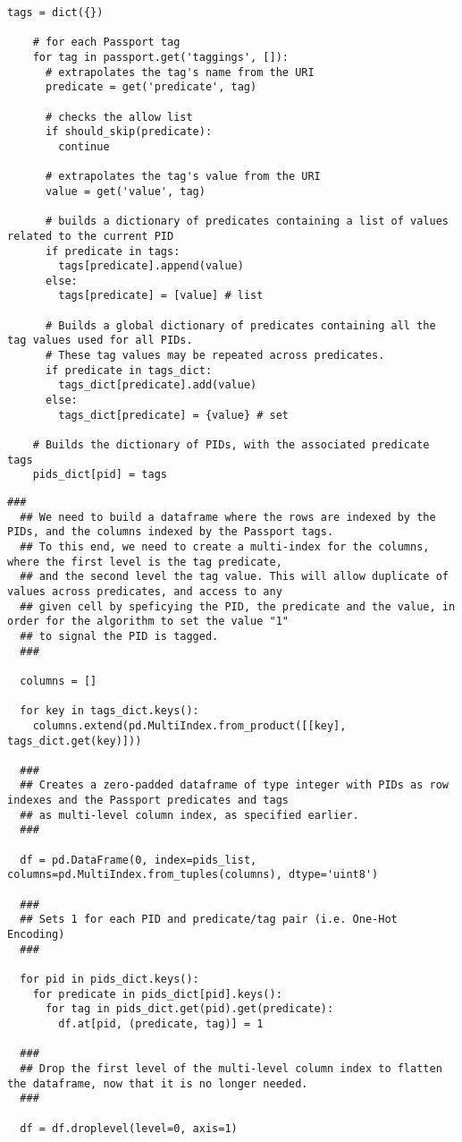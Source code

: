 \begin{lstlisting}[caption={Passport tags loading},label={lst:data_loading}]
    tags = dict({})

    # for each Passport tag
    for tag in passport.get('taggings', []):
      # extrapolates the tag's name from the URI
      predicate = get('predicate', tag)

      # checks the allow list
      if should_skip(predicate):
        continue

      # extrapolates the tag's value from the URI
      value = get('value', tag)

      # builds a dictionary of predicates containing a list of values related to the current PID
      if predicate in tags:
        tags[predicate].append(value)
      else:
        tags[predicate] = [value] # list

      # Builds a global dictionary of predicates containing all the tag values used for all PIDs.
      # These tag values may be repeated across predicates.
      if predicate in tags_dict:
        tags_dict[predicate].add(value)
      else:
        tags_dict[predicate] = {value} # set

    # Builds the dictionary of PIDs, with the associated predicate tags
    pids_dict[pid] = tags
\end{lstlisting}

\begin{lstlisting}[caption={One-hot encoding of the data in a Pandas DataFrame},label={lst:data_encoding}]
  ###
  ## We need to build a dataframe where the rows are indexed by the PIDs, and the columns indexed by the Passport tags.
  ## To this end, we need to create a multi-index for the columns, where the first level is the tag predicate,
  ## and the second level the tag value. This will allow duplicate of values across predicates, and access to any
  ## given cell by speficying the PID, the predicate and the value, in order for the algorithm to set the value "1"
  ## to signal the PID is tagged.
  ###

  columns = []

  for key in tags_dict.keys():
    columns.extend(pd.MultiIndex.from_product([[key], tags_dict.get(key)]))

  ###
  ## Creates a zero-padded dataframe of type integer with PIDs as row indexes and the Passport predicates and tags
  ## as multi-level column index, as specified earlier.
  ###

  df = pd.DataFrame(0, index=pids_list, columns=pd.MultiIndex.from_tuples(columns), dtype='uint8')

  ###
  ## Sets 1 for each PID and predicate/tag pair (i.e. One-Hot Encoding)
  ###

  for pid in pids_dict.keys():
    for predicate in pids_dict[pid].keys():
      for tag in pids_dict.get(pid).get(predicate):
        df.at[pid, (predicate, tag)] = 1

  ###
  ## Drop the first level of the multi-level column index to flatten the dataframe, now that it is no longer needed.
  ###

  df = df.droplevel(level=0, axis=1)
\end{lstlisting}


